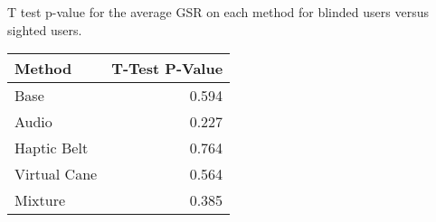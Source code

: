
\centering
\caption{T test p-value for the average GSR on each method for blinded users versus sighted users.}
\label{tab:ttest_gsr_avg}
\begin{tabular}{lr}
\toprule
      Method &  T-Test P-Value \\
\midrule
        Base &           0.594 \\
       Audio &           0.227 \\
 Haptic Belt &           0.764 \\
Virtual Cane &           0.564 \\
     Mixture &           0.385 \\
\bottomrule
\end{tabular}
